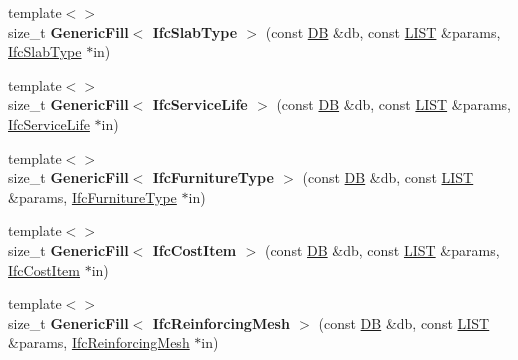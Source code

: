 \begin{DoxyCompactItemize}
\item 
\hypertarget{namespace_assimp_1_1_s_t_e_p_a25cb8fe6afea754a2210c585a4238eaf}{{\footnotesize template$<$$>$ }\\size\+\_\+t {\bfseries Generic\+Fill$<$ Ifc\+Slab\+Type $>$} (const \hyperlink{class_assimp_1_1_s_t_e_p_1_1_d_b}{D\+B} \&db, const \hyperlink{class_assimp_1_1_s_t_e_p_1_1_e_x_p_r_e_s_s_1_1_l_i_s_t}{L\+I\+S\+T} \&params, \hyperlink{struct_assimp_1_1_i_f_c_1_1_ifc_slab_type}{Ifc\+Slab\+Type} $\ast$in)}\label{namespace_assimp_1_1_s_t_e_p_a25cb8fe6afea754a2210c585a4238eaf}

\item 
\hypertarget{namespace_assimp_1_1_s_t_e_p_af3d28647c8e52ab412c14f3b793a32ae}{{\footnotesize template$<$$>$ }\\size\+\_\+t {\bfseries Generic\+Fill$<$ Ifc\+Service\+Life $>$} (const \hyperlink{class_assimp_1_1_s_t_e_p_1_1_d_b}{D\+B} \&db, const \hyperlink{class_assimp_1_1_s_t_e_p_1_1_e_x_p_r_e_s_s_1_1_l_i_s_t}{L\+I\+S\+T} \&params, \hyperlink{struct_assimp_1_1_i_f_c_1_1_ifc_service_life}{Ifc\+Service\+Life} $\ast$in)}\label{namespace_assimp_1_1_s_t_e_p_af3d28647c8e52ab412c14f3b793a32ae}

\item 
\hypertarget{namespace_assimp_1_1_s_t_e_p_a6ea2f68b8a834f5a20e8d8ae5e8568c4}{{\footnotesize template$<$$>$ }\\size\+\_\+t {\bfseries Generic\+Fill$<$ Ifc\+Furniture\+Type $>$} (const \hyperlink{class_assimp_1_1_s_t_e_p_1_1_d_b}{D\+B} \&db, const \hyperlink{class_assimp_1_1_s_t_e_p_1_1_e_x_p_r_e_s_s_1_1_l_i_s_t}{L\+I\+S\+T} \&params, \hyperlink{struct_assimp_1_1_i_f_c_1_1_ifc_furniture_type}{Ifc\+Furniture\+Type} $\ast$in)}\label{namespace_assimp_1_1_s_t_e_p_a6ea2f68b8a834f5a20e8d8ae5e8568c4}

\item 
\hypertarget{namespace_assimp_1_1_s_t_e_p_a2bc8f651e9f73d48160c966a78bd0f01}{{\footnotesize template$<$$>$ }\\size\+\_\+t {\bfseries Generic\+Fill$<$ Ifc\+Cost\+Item $>$} (const \hyperlink{class_assimp_1_1_s_t_e_p_1_1_d_b}{D\+B} \&db, const \hyperlink{class_assimp_1_1_s_t_e_p_1_1_e_x_p_r_e_s_s_1_1_l_i_s_t}{L\+I\+S\+T} \&params, \hyperlink{struct_assimp_1_1_i_f_c_1_1_ifc_cost_item}{Ifc\+Cost\+Item} $\ast$in)}\label{namespace_assimp_1_1_s_t_e_p_a2bc8f651e9f73d48160c966a78bd0f01}

\item 
\hypertarget{namespace_assimp_1_1_s_t_e_p_a0a41e07586e4b01806de8f57c4b3e7c5}{{\footnotesize template$<$$>$ }\\size\+\_\+t {\bfseries Generic\+Fill$<$ Ifc\+Reinforcing\+Mesh $>$} (const \hyperlink{class_assimp_1_1_s_t_e_p_1_1_d_b}{D\+B} \&db, const \hyperlink{class_assimp_1_1_s_t_e_p_1_1_e_x_p_r_e_s_s_1_1_l_i_s_t}{L\+I\+S\+T} \&params, \hyperlink{struct_assimp_1_1_i_f_c_1_1_ifc_reinforcing_mesh}{Ifc\+Reinforcing\+Mesh} $\ast$in)}\label{namespace_assimp_1_1_s_t_e_p_a0a41e07586e4b01806de8f57c4b3e7c5}


\end{DoxyCompactItemize}
